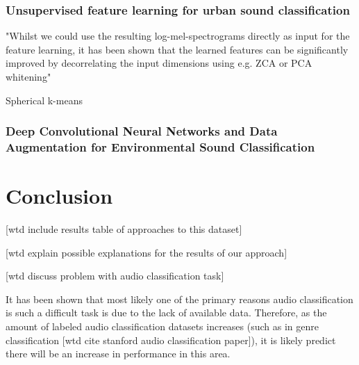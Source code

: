 \subsection{Unsupervised feature learning for urban sound classification}

"Whilst we could use the resulting log-mel-spectrograms directly
as input for the feature learning, it has been shown that the
learned features can be significantly improved by decorrelating the
input dimensions using e.g. ZCA or PCA whitening"

Spherical k-means


\subsection{Deep Convolutional Neural Networks and Data
Augmentation for Environmental Sound
Classification}


\chapter{Conclusion}

[wtd include results table of approaches to this dataset]

[wtd explain possible explanations for the results of our approach]

[wtd discuss problem with audio classification task]

It has been shown that most likely one of the primary reasons audio classification is such a difficult task is due to the lack of available data.  Therefore, as the amount of labeled audio classification datasets increases (such as in genre classification [wtd cite stanford audio classification paper]), it is likely predict there will be an increase in performance in this area.

